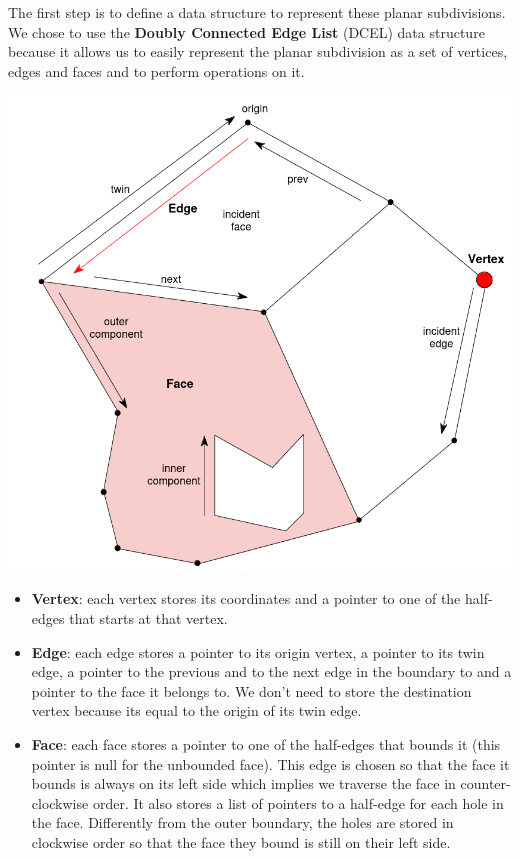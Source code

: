 The first step is to define a data structure to represent these planar subdivisions. We chose to use the \textbf{Doubly Connected Edge List} (DCEL) data structure because it allows us to easily represent the planar subdivision as a set of vertices, edges and faces and to perform operations on it.
\hfill \break
\begin{minipage}{0.5\textwidth}
    \centering
    \includegraphics[width=\textwidth]{images/dcel.png}
\end{minipage}
\begin{minipage}{0.5\textwidth}
    \begin{itemize}
        \item \textbf{Vertex}: each vertex stores its coordinates and a pointer to one of the half-edges that starts at that vertex.
        \item \textbf{Edge}: each edge stores a pointer to its origin vertex, a pointer to its twin edge, a pointer to the previous and to the next edge in the boundary to and a pointer to the face it belongs to. We don't need to store the destination vertex because its equal to the origin of its twin edge.
    \end{itemize}
\end{minipage}
\begin{itemize}
    \item \textbf{Face}: each face stores a pointer to one of the half-edges that bounds it (this pointer is null for the unbounded face). This edge is chosen so that the face it bounds is always on its left side which implies we traverse the face in counter-clockwise order. It also stores a list of pointers to a half-edge for each hole in the face. Differently from the outer boundary, the holes are stored in clockwise order so that the face they bound is still on their left side.
\end{itemize}

